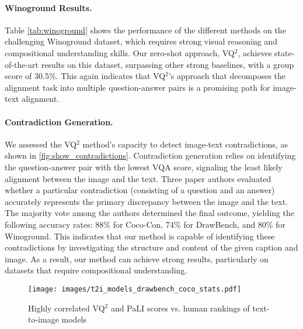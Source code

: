 \documentclass{article}
\newcommand{\VQSQR}[0]{VQ$^2$\xspace}
\begin{document}
\paragraph{Winoground Results.} Table \ref{tab:winoground} shows the performance of the different methods on the challenging Winoground dataset, which requires strong visual reasoning and compositional understanding skills. Our zero-shot approach, \VQSQR, achieves state-of-the-art results on this dataset, surpassing other strong baselines, with a group score of 30.5\%. This again indicates that \VQSQR's approach that decomposes the alignment task into multiple question-answer pairs is a promising path for image-text alignment. 


\paragraph{Contradiction Generation.} We assessed the \VQSQR method's capacity to detect image-text contradictions, as shown in \cref{fig:show_contradictions}. Contradiction generation relies on identifying the question-answer pair with the lowest VQA score, signaling the least likely alignment between the image and the text. Three paper authors evaluated whether a particular contradiction (consisting of a question and an answer) accurately represents the primary discrepancy between the image and the text. The majority vote among the authors determined the final outcome, yielding the following accuracy rates: 88\% for Coco-Con, 74\% for DrawBench, and 80\% for Winoground. This indicates that our method is capable of identifying these contradictions by investigating the structure and content of the given caption and image. As a result, our method can achieve strong results, particularly on datasets that require compositional understanding.


\begin{figure}[!t]
    \centering
    \texttt{[image: images/t2i\_models\_drawbench\_coco\_stats.pdf]}\\
\caption{Highly correlated \VQSQR and PaLI scores vs. human rankings of text-to-image models}
\vspace{-20px}
    \label{fig:t2i_comparison}
\end{figure} 
\end{document}
